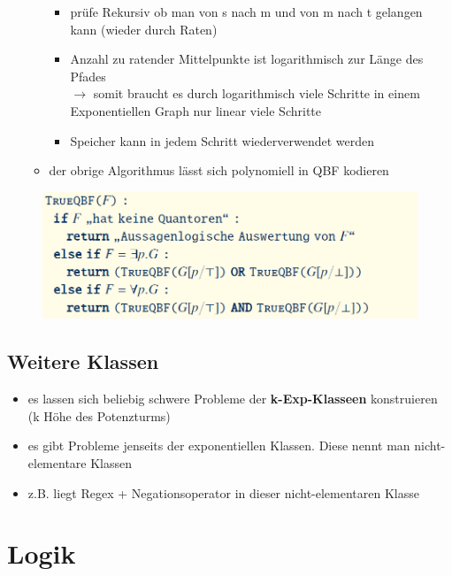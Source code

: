 \documentclass[12pt,a4paper]{article}
\begin{document}
\begin{itemize}
\begin{itemize}
\begin{itemize}
\item prüfe Rekursiv ob man von s nach m und von m nach t gelangen kann (wieder durch Raten)
\item Anzahl zu ratender Mittelpunkte ist logarithmisch zur Länge des Pfades\\
$\rightarrow$ somit braucht es durch logarithmisch viele Schritte in einem Exponentiellen Graph nur linear viele Schritte
\item Speicher kann in jedem Schritt wiederverwendet werden
\end{itemize}
\item der obrige Algorithmus lässt sich polynomiell in QBF kodieren
\end{itemize}
\end{itemize}
\begin{figure}[H]
\includegraphics[scale=0.6]{./resources/QBF_algo.png}
\end{figure}

\subsection{Weitere Klassen}
\begin{itemize}
\item es lassen sich beliebig schwere Probleme der \textbf{k-Exp-Klasseen} konstruieren (k Höhe des Potenzturms)
\item es gibt Probleme jenseits der exponentiellen Klassen. Diese nennt man nicht-elementare Klassen
\item z.B. liegt Regex + Negationsoperator in dieser nicht-elementaren Klasse 
\end{itemize}

\section{Logik}
\end{document}
